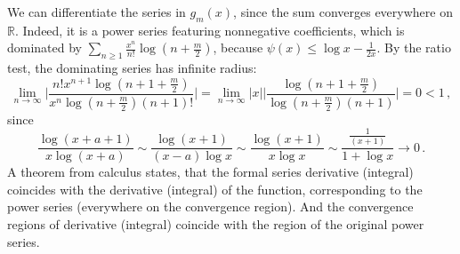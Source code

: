 \documentclass[a4paper,10pt]{article}
\begin{document}
We can differentiate the series in $g_m(x)$, since the sum converges everywhere
on $\mathbb{R}$. Indeed, it is a power series featuring nonnegative coefficients,
which is dominated by $
  \sum_{n \geq 1} \tfrac{x^n}{n!} \log{(n+\tfrac{m}2)}
$, because $\psi(x)\leq \log x - \tfrac1{2x}$. By the ratio test, the dominating
series has infinite radius:
$$
\lim_{n\to\infty}
  \biggl\lvert
    \frac{
      n! x^{n+1} \log{(n + 1 + \tfrac{m}2)}
    }{
      x^n \log{(n + \tfrac{m}2)} (n+1)!
    }
  \biggr\rvert
  = \lim_{n\to\infty}
    \lvert x \rvert 
    \biggl\lvert
      \frac{
        \log{(n + 1 + \tfrac{m}2)}
      }{
        \log{(n + \tfrac{m}2)} (n+1)
      }
    \biggr\rvert
  = 0 < 1
  \,, $$
since
$$
\frac{\log{(x + a + 1)}}{x \log{(x + a)}}
  \sim \frac{\log{(x+1)}}{(x-a) \log{x}}
  \sim \frac{\log{(x+1)}}{x \log{x}}
  \sim \frac{\tfrac1{(x+1)}}{1 + \log{x}}
  \to 0
  \,. $$
A theorem from calculus states, that the formal series derivative (integral)
coincides with the derivative (integral) of the function, corresponding to
the power series (everywhere on the convergence region). And the convergence
regions of derivative (integral) coincide with the region of the original
power series.
\end{document}
